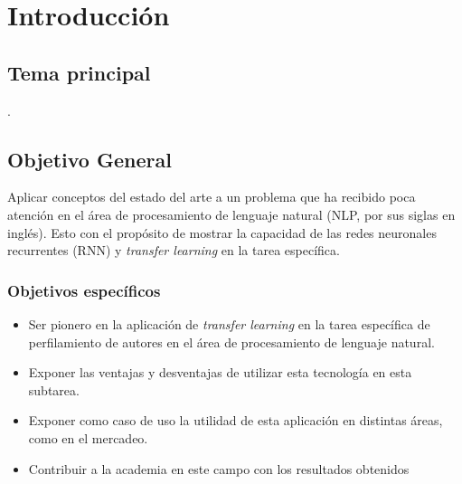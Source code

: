 
\chapter{Introducción} %

\label{Chapter1} %


\newcommand{\keyword}[1]{\textbf{#1}}
\newcommand{\tabhead}[1]{\textbf{#1}}
\newcommand{\code}[1]{\texttt{#1}}
\newcommand{\file}[1]{\texttt{\bfseries#1}}
\newcommand{\option}[1]{\texttt{\itshape#1}}


\section{Tema principal}

\ttitle.



\section{Objetivo General}

Aplicar conceptos del estado del arte a un problema que ha recibido poca atención en el área de procesamiento de lenguaje natural (NLP, por sus siglas en inglés). Esto con el propósito de mostrar la capacidad de las redes neuronales recurrentes (RNN) y \emph{transfer learning} en la tarea específica.

\subsection{Objetivos específicos}

\begin{itemize}
\item Ser pionero en la aplicación de \emph{transfer learning} en la tarea específica de perfilamiento de autores en el área de procesamiento de lenguaje natural.
\item Exponer las ventajas y desventajas de utilizar esta tecnología en esta subtarea.
\item Exponer como caso de uso la utilidad de esta aplicación en distintas áreas, como en el mercadeo.
\item Contribuir a la academia en este campo con los resultados obtenidos
\end{itemize}

